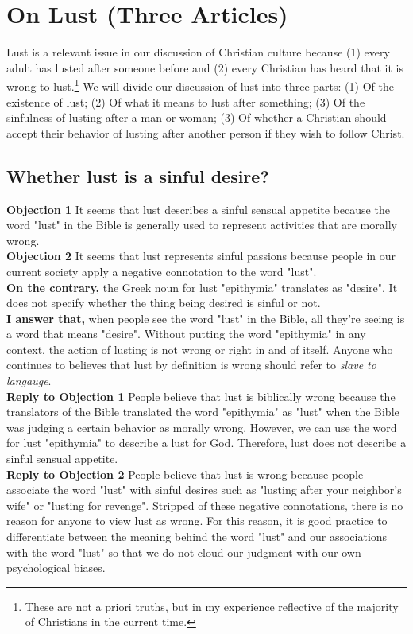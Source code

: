 \documentclass[a4paper, parskip=full, 12pt]{article}
\begin{document}
\section{On Lust (Three Articles)}
Lust is a relevant issue in our discussion of Christian culture because (1) every adult has lusted after someone before and (2) every Christian has heard that it is wrong to lust.\footnote{These are not a priori truths, but in my experience reflective of the majority of Christians in the current time.} We will divide our discussion of lust into three parts: (1) Of the existence of lust; (2) Of what it means to lust after something; (3) Of the sinfulness of lusting after a man or woman; (3) Of whether a Christian should accept their behavior of lusting after another person if they wish to follow Christ. \\
\subsection{Whether lust is a sinful desire?}
\textbf{Objection 1} It seems that lust describes a sinful sensual appetite because the word "lust" in the Bible is generally used to represent activities that are morally wrong. \\
\textbf{Objection 2} It seems that lust represents sinful passions because people in our current society apply a negative connotation to the word "lust". \\
\textbf{On the contrary,} the Greek noun for lust "epithymia" translates as "desire". It does not specify whether the thing being desired is sinful or not. \\
\textbf{I answer that,} when people see the word "lust" in the Bible, all they're seeing is a word that means "desire". Without putting the word "epithymia" in any context, the action of lusting is not wrong or right in and of itself. Anyone who continues to believes that lust by definition is wrong should refer to \textit{slave to langauge}. \\
\textbf{Reply to Objection 1} People believe that lust is biblically wrong because the translators of the Bible translated the word "epithymia" as "lust" when the Bible was judging a certain behavior as morally wrong. However, we can use the word for lust "epithymia" to describe a lust for God. Therefore, lust does not describe a sinful sensual appetite. \\
\textbf{Reply to Objection 2} People believe that lust is wrong because people associate the word "lust" with sinful desires such as "lusting after your neighbor's wife" or "lusting for revenge". Stripped of these negative connotations, there is no reason for anyone to view lust as wrong. For this reason, it is good practice to differentiate between the meaning behind the word "lust" and our associations with the word "lust" so that we do not cloud our judgment with our own psychological biases. \\
\end{document}
